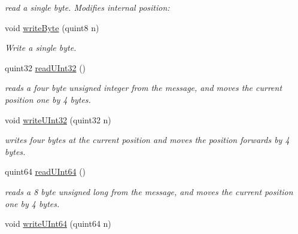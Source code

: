 \begin{DoxyCompactItemize}
\begin{DoxyCompactList}\small\item\em read a single byte. Modifies internal position\+: \end{DoxyCompactList}\item 
void \hyperlink{class_i_o_buffer_a45ee7000e2252bf5fe174ca8c62851af}{write\+Byte} (quint8 n)\hypertarget{class_i_o_buffer_a45ee7000e2252bf5fe174ca8c62851af}{}\label{class_i_o_buffer_a45ee7000e2252bf5fe174ca8c62851af}

\begin{DoxyCompactList}\small\item\em Write a single byte. \end{DoxyCompactList}\item 
quint32 \hyperlink{class_i_o_buffer_a3196ccee986397959ea380ebc7d78a60}{read\+U\+Int32} ()\hypertarget{class_i_o_buffer_a3196ccee986397959ea380ebc7d78a60}{}\label{class_i_o_buffer_a3196ccee986397959ea380ebc7d78a60}

\begin{DoxyCompactList}\small\item\em reads a four byte unsigned integer from the message, and moves the current position one by 4 bytes. \end{DoxyCompactList}\item 
void \hyperlink{class_i_o_buffer_aebba84dbb318f0b032269bb82edb204e}{write\+U\+Int32} (quint32 n)\hypertarget{class_i_o_buffer_aebba84dbb318f0b032269bb82edb204e}{}\label{class_i_o_buffer_aebba84dbb318f0b032269bb82edb204e}

\begin{DoxyCompactList}\small\item\em writes four bytes at the current position and moves the position forwards by 4 bytes. \end{DoxyCompactList}\item 
quint64 \hyperlink{class_i_o_buffer_ab263efa258ef2ff16a4025d92b345c27}{read\+U\+Int64} ()\hypertarget{class_i_o_buffer_ab263efa258ef2ff16a4025d92b345c27}{}\label{class_i_o_buffer_ab263efa258ef2ff16a4025d92b345c27}

\begin{DoxyCompactList}\small\item\em reads a 8 byte unsigned long from the message, and moves the current position one by 4 bytes. \end{DoxyCompactList}\item 
void \hyperlink{class_i_o_buffer_aa75e90ba59b00c9059276d9c5b129699}{write\+U\+Int64} (quint64 n)\hypertarget{class_i_o_buffer_aa75e90ba59b00c9059276d9c5b129699}{}\label{class_i_o_buffer_aa75e90ba59b00c9059276d9c5b129699}


\end{DoxyCompactItemize}
